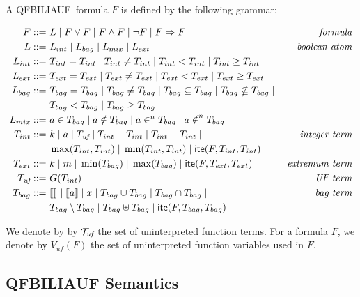 \begin{mydef}
A QFBILIAUF\ formula $F$ is defined by the following grammar:
\begin{small}
\begin{align*}
F ::= &\ L \; | \; F\lor F \; | \; F\land F \; | \; \lnot F \; | \; F\Rightarrow F
& \textit{formula}
\\
L ::= &\ L_{int} \; |\; L_{bag} \; |\; L_{mix} \; |\; L_{ext}
& \textit{boolean atom}
\\
L_{int} ::= &\ T_{int} = T_{int} \; |\; T_{int} \neq T_{int} \; |\; T_{int} < T_{int}\; |\;  T_{int} \ge T_{int}
\\
L_{ext} ::= &\ T_{ext} = T_{ext} \; |\; T_{ext} \neq T_{ext} \; |\; T_{ext} < T_{ext}\; |\;  T_{ext} \ge T_{ext}
\\
L_{bag} ::= &\ T_{bag} = T_{bag} \; |\;T_{bag} \neq T_{bag} \; |\;
T_{bag} \subseteq T_{bag} \; |\;T_{bag} \nsubseteq T_{bag} \; | \;
\\
&\ T_{bag} < T_{bag} \; |\;T_{bag} \ge T_{bag}
\\
L_{mix} ::= &\ a \in T_{bag}\; |\;a \notin T_{bag}\; |\;a \in^{n} T_{bag}\; |\;a \notin^{n} T_{bag}
\\
T_{int} ::= &\  k \;|\; a \;|\; T_{\textit{uf}} \;|\;  T_{int} + T_{int} \;|\; T_{int} - T_{int}\;|\;
& \textit{integer term}
\\
&\ \max(T_{int},T_{int})\;|\; \min(T_{int},T_{int}) \;|\; \textsf{ite}(F,T_{int},T_{int})
\\
T_{ext} ::= &\ k \;|\; m \;|\; \min(T_{bag}) \;|\; \max(T_{bag}) \;|\; \textsf{ite}(F,T_{ext},T_{ext})
& \textit{extremum term}
\\
T_{\textit{uf}} ::= &\ G(T_{int})
&\textit{UF term}
\\
T_{bag} ::= &\ \llbracket  \rrbracket\;|\;\llbracket a \rrbracket \;|\;x \;|\; T_{bag} \cup T_{bag} \;|\; T_{bag} \cap T_{bag} \;|\;
& \textit{bag term}
\\
&\ T_{bag} \setminus T_{bag}\;|\; T_{bag} \uplus T_{bag} \;|\; \textsf{ite}(F,T_{bag},T_{bag})
\\
\end{align*}
\end{small}
\end{mydef}


We denote by by $\mathcal{T}_{\textit{uf}}$ the set of uninterpreted function terms.
For a formula $F$, we denote by $V_{\textit{uf}}(F)$ the set of uninterpreted function variables used in $F$.

\subsection{QFBILIAUF Semantics}
\label{ssec:semUF}

